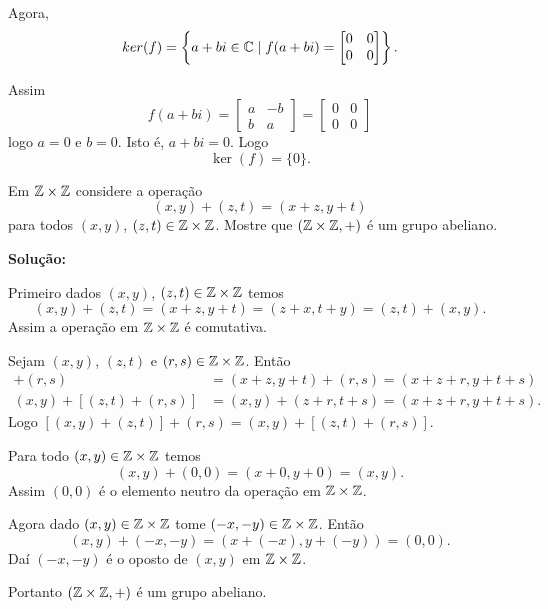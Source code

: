 \documentclass[12pt]{article}
\begin{document}
Agora,
\[
	ker(f) = \left\{a + bi \in \mathbb{C} \mid f(a + bi) = \begin{bmatrix}
		0 & 0\\
		0 & 0
	\end{bmatrix}\right\}.
\]

Assim
\[
	f(a + bi) = \begin{bmatrix}
		a & -b\\
		b & a
	\end{bmatrix} = \begin{bmatrix}
		0 & 0\\
		0 & 0
	\end{bmatrix}
\]
logo $a = 0$ e $b = 0$. Isto é, $a + bi = 0$. Logo 
\[
	\ker(f) = \{0\}.
\]

\vspace{1cm}

\questao Em $\mathbb{Z} \times\mathbb{Z}$ considere a operação
\[
	(x, y) + (z, t) = (x + z, y + t)
\]
para todos $(x,y)$, $(z,t) \in \mathbb{Z}\times\mathbb{Z}$. Mostre que $(\mathbb{Z}\times\mathbb{Z}, +)$ é um grupo abeliano.

\noindent\textbf{Solu\c{c}\~ao:}

Primeiro dados $(x,y)$, $(z,t) \in \mathbb{Z}\times\mathbb{Z}$ temos
\[
	(x,y) + (z,t) = (x+z,y+t) = (z+x,t+y) = (z,t) + (x,y).
\]
Assim a operação em $\mathbb{Z}\times\mathbb{Z}$ é comutativa.

Sejam $(x,y)$, $(z,t)$ e $(r,s) \in \mathbb{Z}\times\mathbb{Z}$. Então
\begin{align*}
	[(x,y) + (z,t)] + (r,s) &= (x + z, y+t) + (r,s) = (x+z+r,y+t+s)\\
	(x,y) + [(z,t)+(r,s)] &= (x,y) + (z+r,t+s) = (x+z+r,y+t+s).
\end{align*}
Logo $[(x,y)+(z,t)] + (r,s) = (x,y) + [(z,t) + (r,s)]$.

Para todo $(x,y) \in \mathbb{Z}\times\mathbb{Z}$ temos
\[
	(x,y) + (0,0) = (x+0,y+0) = (x,y).
\]
Assim $(0,0)$ é o elemento neutro da operação em $\mathbb{Z}\times\mathbb{Z}$.

Agora dado $(x,y) \in \mathbb{Z}\times\mathbb{Z}$ tome $(-x,-y) \in \mathbb{Z}\times\mathbb{Z}$. Então
\[
	(x,y) + (-x,-y) = (x+(-x),y+(-y)) = (0,0).
\]
Daí $(-x,-y)$ é o oposto de $(x,y)$ em $\mathbb{Z}\times\mathbb{Z}$.

Portanto $(\mathbb{Z}\times\mathbb{Z},+)$ é um grupo abeliano.
\end{document}
